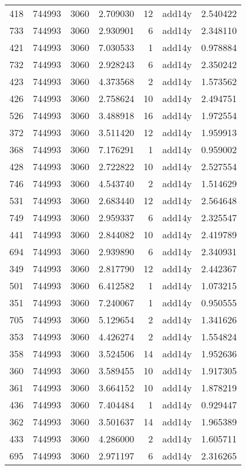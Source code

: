 \begin{tabular}{lrrrrlr}
418 & 744993 & 3060 & 2.709030 & 12 & add14y & 2.540422 \\
733 & 744993 & 3060 & 2.930901 & 6 & add14y & 2.348110 \\
421 & 744993 & 3060 & 7.030533 & 1 & add14y & 0.978884 \\
732 & 744993 & 3060 & 2.928243 & 6 & add14y & 2.350242 \\
423 & 744993 & 3060 & 4.373568 & 2 & add14y & 1.573562 \\
426 & 744993 & 3060 & 2.758624 & 10 & add14y & 2.494751 \\
526 & 744993 & 3060 & 3.488918 & 16 & add14y & 1.972554 \\
372 & 744993 & 3060 & 3.511420 & 12 & add14y & 1.959913 \\
368 & 744993 & 3060 & 7.176291 & 1 & add14y & 0.959002 \\
428 & 744993 & 3060 & 2.722822 & 10 & add14y & 2.527554 \\
746 & 744993 & 3060 & 4.543740 & 2 & add14y & 1.514629 \\
531 & 744993 & 3060 & 2.683440 & 12 & add14y & 2.564648 \\
749 & 744993 & 3060 & 2.959337 & 6 & add14y & 2.325547 \\
441 & 744993 & 3060 & 2.844082 & 10 & add14y & 2.419789 \\
694 & 744993 & 3060 & 2.939890 & 6 & add14y & 2.340931 \\
349 & 744993 & 3060 & 2.817790 & 12 & add14y & 2.442367 \\
501 & 744993 & 3060 & 6.412582 & 1 & add14y & 1.073215 \\
351 & 744993 & 3060 & 7.240067 & 1 & add14y & 0.950555 \\
705 & 744993 & 3060 & 5.129654 & 2 & add14y & 1.341626 \\
353 & 744993 & 3060 & 4.426274 & 2 & add14y & 1.554824 \\
358 & 744993 & 3060 & 3.524506 & 14 & add14y & 1.952636 \\
360 & 744993 & 3060 & 3.589455 & 10 & add14y & 1.917305 \\
361 & 744993 & 3060 & 3.664152 & 10 & add14y & 1.878219 \\
436 & 744993 & 3060 & 7.404484 & 1 & add14y & 0.929447 \\
362 & 744993 & 3060 & 3.501637 & 14 & add14y & 1.965389 \\
433 & 744993 & 3060 & 4.286000 & 2 & add14y & 1.605711 \\
695 & 744993 & 3060 & 2.971197 & 6 & add14y & 2.316265 \\

\end{tabular}
